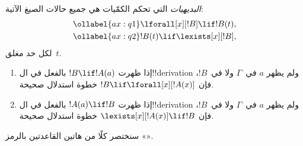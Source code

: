 \documentclass[../../../include/open-logic-section]{subfiles}
\begin{document}


\begin{defn}
\emph{البديهيات} التي تحكم الكمّيات هي جميع حالات الصيغ الآتية:
\begin{align}
\ollabel{ax:q1} & \lforall[x][!B] \lif !B(t), \\
\ollabel{ax:q2} & !B(t) \lif \lexists[x][!B],
\end{align}
لكل حد مغلق~$t$.
\end{defn}

\begin{defn}
\begin{enumerate}
\item إذا ظهرت $!B \lif !A(a)$ بالفعل في ال!!{derivation} ولم يظهر
  $a$ في~$\Gamma$ ولا في~$!B$، فإن $!B \lif
  \lforall[x][!A(x)]$ خطوة استدلال صحيحة.
\item إذا ظهرت $!A(a) \lif !B$ بالفعل في ال!!{derivation} ولم يظهر
  $a$ في~$\Gamma$ ولا في~$!B$، فإن $\lexists[x][!A(x)] \lif
  !B$ خطوة استدلال صحيحة.
\end{enumerate}
\end{defn}

سنختصر كلًا من هاتين القاعدتين بالرمز «\QR».
\end{document}
